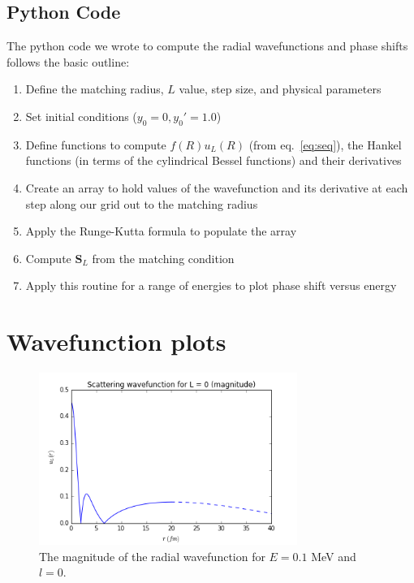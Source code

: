 \documentclass[]{scrartcl}
\begin{document}
\subsection*{Python Code}

The python code we wrote to compute the radial wavefunctions and phase shifts follows the basic outline:

\begin{enumerate}
	\item Define the matching radius, $L$ value, step size, and physical parameters
	\item Set initial conditions ($y_0 = 0, y_0 ' = 1.0$) 
	\item Define functions to compute $f(R)u_L(R)$ (from eq.~\ref{eq:seq}), the Hankel functions (in terms of the cylindrical Bessel functions) and their derivatives
	\item Create an array to hold values of the wavefunction and its derivative at each step along our grid out to the matching radius
	\item Apply the Runge-Kutta formula to populate the array
	\item Compute $\mathbf{S}_L$ from the matching condition
	\item Apply this routine for a range of energies to plot phase shift versus energy
\end{enumerate}


\section*{Wavefunction plots}

\begin{figure}[h]
\centering
	\includegraphics[width=0.75\textwidth]{figures/E01/magnitude0.png}
	\caption{The magnitude of the radial wavefunction for $E = 0.1$ MeV and $l=0$.}
	\label{fig:e01l0}
\end{figure}
\end{document}
